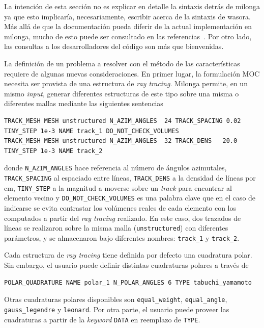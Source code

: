 \documentclass[11pt]{article}
\numberwithin{equation}{section}
\begin{document}
La intenci\'on de esta secci\'on no es explicar en detalle la sintaxis detr\'as de milonga ya que esto implicar\'ia, necesariamente, escribir acerca de la sintaxis de wasora. M\'as all\'a de que la documentaci\'on pueda diferir de la actual implementación en milonga, mucho de esto puede ser consultado en las referencias~\cite{wasora, milongabase2010, milonga-db, enief-milonga-2014}. Por otro lado, las consultas a los desarrolladores del c\'odigo son m\'as que bienvenidas. 

La definici\'on de un problema a resolver con el m\'etodo de las características requiere de algunas nuevas consideraciones. En primer lugar, la formulación MOC necesita ser provista de una estructura de \emph{ray tracing}. Milonga permite, en un mismo \emph{input}, generar diferentes estructuras de este tipo sobre una misma o diferentes mallas mediante las siguientes sentencias

\begin{lstlisting}[style=wasora]
TRACK_MESH MESH unstructured N_AZIM_ANGLES  24 TRACK_SPACING 0.02 TINY_STEP 1e-3 NAME track_1 DO_NOT_CHECK_VOLUMES
TRACK_MESH MESH unstructured N_AZIM_ANGLES  32 TRACK_DENS   20.0  TINY_STEP 1e-3 NAME track_2
\end{lstlisting}

\noindent
donde \texttt{N_AZIM_ANGLES} hace referencia al n\'umero de \'angulos azimutales, \texttt{TRACK_SPACING} al espaciado entre l\'ineas, \texttt{TRACK_DENS} a la densidad de l\'ineas por \si{\centi\metre}, \texttt{TINY_STEP} a la magnitud a moverse sobre un \emph{track} para encontrar al elemento vecino y \texttt{DO_NOT_CHECK_VOLUMES} es una palabra clave que en el caso de indicarse se evita contrastar los volúmenes reales de cada elemento con los computados a partir del \emph{ray tracing} realizado. En este caso, dos trazados de l\'ineas se realizaron sobre la misma malla (\texttt{unstructured}) con diferentes par\'ametros, y se almacenaron bajo diferentes nombres: \texttt{track_1} y \texttt{track_2}.

Cada estructura de \emph{ray tracing} tiene definida por defecto una cuadratura polar. Sin embargo, el usuario puede definir distintas cuadraturas polares a trav\'es de

\begin{lstlisting}[style=wasora]
POLAR_QUADRATURE NAME polar_1 N_POLAR_ANGLES 6 TYPE tabuchi_yamamoto
\end{lstlisting}

\noindent
Otras cuadraturas polares disponibles son \texttt{equal_weight}, \texttt{equal_angle}, \texttt{gauss_legendre} y \texttt{leonard}. Por otra parte, el usuario puede proveer las cuadraturas a partir de la \emph{keyword} \texttt{DATA} en reemplazo de \texttt{TYPE}.
\end{document}
